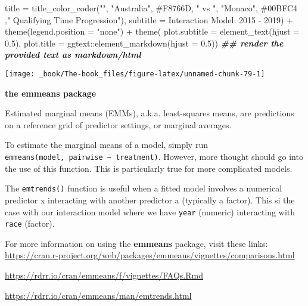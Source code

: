 \documentclass[
]{book}
\newenvironment{Shaded}{\begin{snugshade}}{\end{snugshade}}
\newcommand{\AttributeTok}[1]{\textcolor[rgb]{0.77,0.63,0.00}{#1}}
\newcommand{\DocumentationTok}[1]{\textcolor[rgb]{0.56,0.35,0.01}{\textbf{\textit{#1}}}}
\newcommand{\FloatTok}[1]{\textcolor[rgb]{0.00,0.00,0.81}{#1}}
\newcommand{\FunctionTok}[1]{\textcolor[rgb]{0.00,0.00,0.00}{#1}}
\newcommand{\NormalTok}[1]{#1}
\newcommand{\SpecialCharTok}[1]{\textcolor[rgb]{0.00,0.00,0.00}{#1}}
\newcommand{\StringTok}[1]{\textcolor[rgb]{0.31,0.60,0.02}{#1}}
\begin{document}
\begin{Shaded}
\begin{Highlighting}[]
       \AttributeTok{title =} \FunctionTok{title\_color\_coder}\NormalTok{(}\StringTok{""}\NormalTok{, }\StringTok{"Australia"}\NormalTok{, }\StringTok{\textquotesingle{}\#F8766D\textquotesingle{}}\NormalTok{, }\StringTok{" vs "}\NormalTok{, }\StringTok{"Monaco"}\NormalTok{, }\StringTok{\textquotesingle{}\#00BFC4\textquotesingle{}}\NormalTok{ ,}\StringTok{" Qualifying Time Progression"}\NormalTok{), }
       \AttributeTok{subtitle =} \StringTok{\textquotesingle{}Interaction Model: 2015 {-} 2019\textquotesingle{}}\NormalTok{) }\SpecialCharTok{+} 
  \FunctionTok{theme}\NormalTok{(}\AttributeTok{legend.position =} \StringTok{"none"}\NormalTok{) }\SpecialCharTok{+}
  \FunctionTok{theme}\NormalTok{( }\AttributeTok{plot.subtitle =} \FunctionTok{element\_text}\NormalTok{(}\AttributeTok{hjust =} \FloatTok{0.5}\NormalTok{),}
        \AttributeTok{plot.title =}\NormalTok{ ggtext}\SpecialCharTok{::}\FunctionTok{element\_markdown}\NormalTok{(}\AttributeTok{hjust =} \FloatTok{0.5}\NormalTok{)) }\DocumentationTok{\#\# render the provided text as markdown/html}
\end{Highlighting}
\end{Shaded}

\begin{center}\texttt{[image: \_book/The-book\_files/figure-latex/unnamed-chunk-79-1]} \end{center}

\begin{blackbox}

\begin{center}
\textbf{the emmeans package}

\end{center}

Estimated marginal means (EMMs), a.k.a. least-squares means, are predictions on a reference grid of predictor settings, or marginal averages.

To estimate the marginal means of a model, simply run \texttt{emmeans(model,\ pairwise\ \textasciitilde{}\ treatment)}. However, more thought should go into the use of this function. This is particularly true for more complicated models.

The \texttt{emtrends()} function is useful when a fitted model involves a numerical predictor x interacting with another predictor a (typically a factor). This si the case with our interaction model where we have \texttt{year} (numeric) interacting with \texttt{race} (factor).

For more information on using the \textbf{emmeans} package, visit these links: \url{https://cran.r-project.org/web/packages/emmeans/vignettes/comparisons.html}

\url{https://rdrr.io/cran/emmeans/f/vignettes/FAQs.Rmd}

\url{https://rdrr.io/cran/emmeans/man/emtrends.html}

\end{blackbox}
\end{document}
